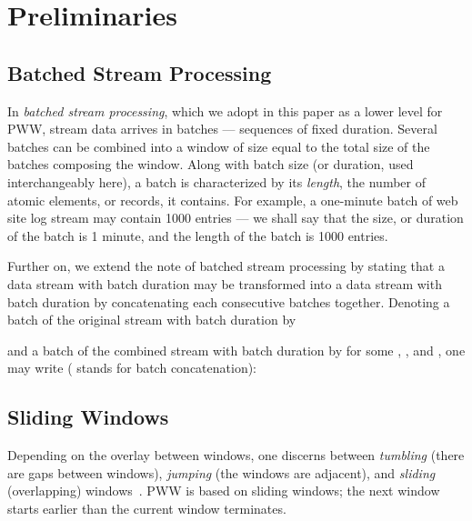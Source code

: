 \documentclass[runningheads,a4paper]{llncs}
\begin{document}
\section{Preliminaries}
\label{sec:preliminaries}

\subsection{Batched Stream Processing}

In \textit{batched stream processing}, which we adopt in this
paper as a lower level for PWW, stream data arrives in batches
--- sequences of fixed duration. Several batches can be combined
into a window of size equal to the total size of the batches
composing the window. Along with batch size (or duration, used
interchangeably here), a batch is characterized by its
\textit{length}, the number of atomic elements, or records, it
contains. For example, a one-minute batch of web site log stream
may contain 1000 entries --- we shall say that the size, or
duration of the batch is 1 minute, and the length of the batch
is 1000 entries.

Further on, we extend the note of batched stream processing by
stating that a data stream with batch duration  may be
transformed into a data stream with batch duration  by
concatenating each  consecutive batches together. Denoting
a batch of the original stream with batch duration  by

and a batch of the combined stream with batch duration  by
 for some , , and , one may write ( stands for batch
concatenation):



\subsection{Sliding Windows}

Depending on the overlay between windows, one discerns between
\textit{tumbling} (there are gaps between windows),
\textit{jumping} (the windows are adjacent), and
\textit{sliding} (overlapping) windows~\cite{GO03}. PWW is based on sliding
windows; the next window starts earlier than the current window
terminates. 
\end{document}
